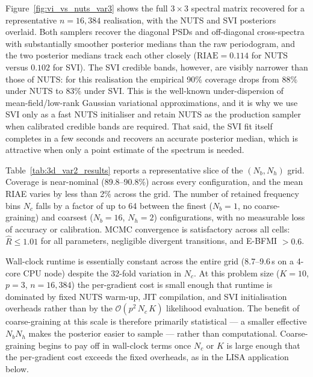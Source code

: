 \documentclass[%
	reprint,
	nofootinbib,
	amsmath,
	amssymb,
	aps,
]{revtex4-2}
\begin{document}
	Figure~\ref{fig:vi_vs_nuts_var3} shows the full $3\times 3$ spectral
	matrix recovered for a representative $n=16{,}384$ realisation, with
	the NUTS and SVI posteriors overlaid. Both samplers recover the
	diagonal PSDs and off-diagonal cross-spectra with substantially
	smoother posterior medians than the raw periodogram, and the two
	posterior medians track each other closely ($\mathrm{RIAE}=0.114$
	for NUTS versus $0.102$ for SVI). The SVI credible bands, however,
	are visibly narrower than those of NUTS: for this realisation the
	empirical 90\% coverage drops from $88\%$ under NUTS to $83\%$ under
	SVI. This is the well-known under-dispersion of mean-field/low-rank
	Gaussian variational approximations, and it is why we use SVI only
	as a fast NUTS initialiser and retain NUTS as the production sampler
	when calibrated credible bands are required. That said, the SVI fit
	itself completes in a few seconds and recovers an accurate posterior
	median, which is attractive when only a point estimate of the
	spectrum is needed.

	Table~\ref{tab:3d_var2_results} reports a representative slice of the
	$(N_{b},N_{h})$ grid. Coverage is near-nominal (89.8--90.8\%) across
	every configuration, and the mean RIAE varies by less than 2\% across
	the grid. The number of retained frequency bins $N_{c}$ falls by a
	factor of up to 64 between the finest ($N_{b}=1$, no coarse-graining) and
	coarsest ($N_{b}=16$, $N_{h}=2$) configurations, with no measurable
	loss of accuracy or calibration. MCMC convergence is satisfactory
	across all cells: $\hat{R}\leq 1.01$ for all parameters, negligible
	divergent transitions, and E-BFMI $>0.6$.

	Wall-clock runtime is essentially constant across the entire grid
	(8.7--9.6\,s on a 4-core CPU node) despite the 32-fold variation in
	$N_{c}$. At this problem size ($K=10$, $p=3$, $n=16{,}384$) the
	per-gradient cost is small enough that runtime is dominated by fixed
	NUTS warm-up, JIT compilation, and SVI initialisation overheads
	rather than by the $\mathcal{O}(p^{2}\,N_{c}\,K)$ likelihood evaluation.
	The benefit of coarse-graining at this scale is therefore primarily
	statistical --- a smaller effective $N_{b}N_{h}$ makes the posterior
	easier to sample --- rather than computational. Coarse-graining begins
	to pay off in wall-clock terms once $N_{c}$ or $K$ is large enough
	that the per-gradient cost exceeds the fixed overheads, as in the
	LISA application below.
\end{document}
